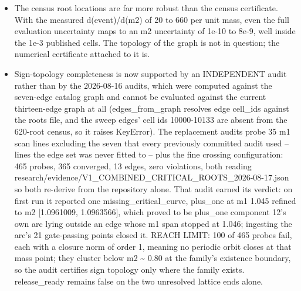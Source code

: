 \begin{itemize}
\item The census root locations are far more robust than the census certificate. With the measured d(event)/d(m2) of 20 to 660 per unit mass, even the full evaluation uncertainty maps to an m2 uncertainty of 1e-10 to 8e-9, well inside the 1e-3 published cells. The topology of the graph is not in question; the numerical certificate attached to it is.
\item Sign-topology completeness is now supported by an INDEPENDENT audit rather than by the 2026-08-16 audits, which were computed against the seven-edge catalog graph and cannot be evaluated against the current thirteen-edge graph at all (edges\_from\_graph resolves edge cell\_ids against the roots file, and the sweep edges' cell ids 10000-10133 are absent from the 620-root census, so it raises KeyError). The replacement audits probe 35 m1 scan lines excluding the seven that every previously committed audit used -- lines the edge set was never fitted to -- plus the fine crossing configuration: 465 probes, 365 converged, 13 edges, zero violations, both reading research/evidence/V1\_COMBINED\_CRITICAL\_ROOTS\_2026-08-17.json so both re-derive from the repository alone. That audit earned its verdict: on first run it reported one missing\_critical\_curve, plus\_one at m1 1.045 refined to m2 [1.0961009, 1.0963566], which proved to be plus\_one component 12's own arc lying outside an edge whose m1 span stopped at 1.046; ingesting the arc's 21 gate-passing points closed it. REACH LIMIT: 100 of 465 probes fail, each with a closure norm of order 1, meaning no periodic orbit closes at that mass point; they cluster below m2 \textasciitilde{} 0.80 at the family's existence boundary, so the audit certifies sign topology only where the family exists. release\_ready remains false on the two unresolved lattice ends alone.

\end{itemize}
